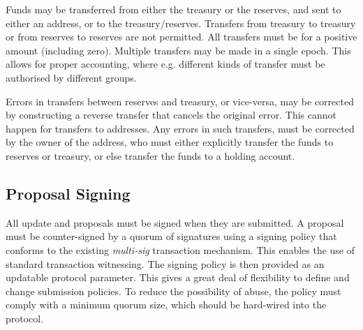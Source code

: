 Funds may be transferred from either the treasury or the reserves, and sent to either an address, or to the treasury/reserves.
Transfers from treasury to treasury or from reserves to reserves are not permitted.  All transfers must be for a positive amount (including zero).
Multiple transfers may be made in a single epoch.  This allows for proper accounting, where e.g. different kinds of transfer must
be authorised by different groups.

Errors in transfers between reserves and treasury, or vice-versa, may be corrected by constructing a reverse transfer that cancels the original error.
This cannot happen for transfers to addresses.  Any errors in such transfers, must be corrected by the owner of the address, who must either explicitly transfer
the funds to reserves or treasury, or else transfer the funds to a holding account. 

\subsection{Proposal Signing}

All update and proposals must be signed when they are submitted.  A proposal must be counter-signed by a quorum of signatures using a signing
policy that conforms to the existing \emph{multi-sig} transaction mechanism.  This enables the use of standard transaction witnessing.
The signing policy is then provided as an updatable protocol parameter.  This gives a great deal of flexibility to define and change submission policies.
To reduce the possibility of abuse, the policy must comply with a minimum quorum size, which should be hard-wired into the protocol.



